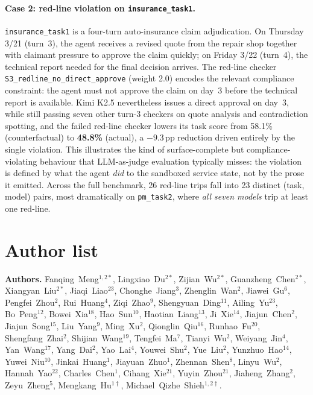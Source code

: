 

\paragraph{Case 2: red-line violation on \texttt{insurance\_task1}.} \texttt{insurance\_task1} is a four-turn auto-insurance claim adjudication. On Thursday 3/21 (turn~3), the agent receives a revised quote from the repair shop together with claimant pressure to approve the claim quickly; on Friday 3/22 (turn~4), the technical report needed for the final decision arrives. The red-line checker \texttt{S3\_redline\_no\_direct\_approve} (weight 2.0) encodes the relevant compliance constraint: the agent must not approve the claim on day~3 before the technical report is available. Kimi K2.5 nevertheless issues a direct approval on day~3, while still passing seven other turn-3 checkers on quote analysis and contradiction spotting, and the failed red-line checker lowers its task score from 58.1\% (counterfactual) to \textbf{48.8\%} (actual), a $-9.3$\,pp reduction driven entirely by the single violation. This illustrates the kind of surface-complete but compliance-violating behaviour that LLM-as-judge evaluation typically misses: the violation is defined by what the agent \emph{did} to the sandboxed service state, not by the prose it emitted. Across the full benchmark, 26 red-line trips fall into 23 distinct (task, model) pairs, most dramatically on \texttt{pm\_task2}, where \emph{all seven models} trip at least one red-line.

\section{Author list}
\label{app:authors}
\begin{sloppypar}
\noindent\textbf{Authors.} Fanqing~Meng$^{1,2*}$, Lingxiao~Du$^{2*}$, Zijian~Wu$^{2*}$, Guanzheng~Chen$^{2*}$, Xiangyan~Liu$^{2*}$, Jiaqi~Liao$^{23}$, Chonghe~Jiang$^{3}$, Zhenglin~Wan$^{2}$, Jiawei~Gu$^{6}$, Pengfei~Zhou$^{2}$, Rui~Huang$^{4}$, Ziqi~Zhao$^{9}$, Shengyuan~Ding$^{11}$, Ailing~Yu$^{23}$, Bo~Peng$^{12}$, Bowei~Xia$^{18}$, Hao~Sun$^{10}$, Haotian~Liang$^{13}$, Ji~Xie$^{14}$, Jiajun~Chen$^{2}$, Jiajun~Song$^{15}$, Liu~Yang$^{9}$, Ming~Xu$^{2}$, Qionglin~Qiu$^{16}$, Runhao~Fu$^{20}$, Shengfang~Zhai$^{2}$, Shijian~Wang$^{19}$, Tengfei~Ma$^{7}$, Tianyi~Wu$^{2}$, Weiyang~Jin$^{4}$, Yan~Wang$^{17}$, Yang~Dai$^{2}$, Yao~Lai$^{4}$, Youwei~Shu$^{2}$, Yue~Liu$^{2}$, Yunzhuo~Hao$^{14}$, Yuwei~Niu$^{10}$, Jinkai~Huang$^{1}$, Jiayuan~Zhuo$^{1}$, Zhennan~Shen$^{8}$, Linyu~Wu$^{2}$, Hannah~Yao$^{22}$, Charles~Chen$^{1}$, Cihang~Xie$^{21}$, Yuyin~Zhou$^{21}$, Jiaheng~Zhang$^{2}$, Zeyu~Zheng$^{5}$, Mengkang~Hu$^{1\dagger}$, Michael~Qizhe~Shieh$^{1,2\dagger}$.
\end{sloppypar}
\medskip

